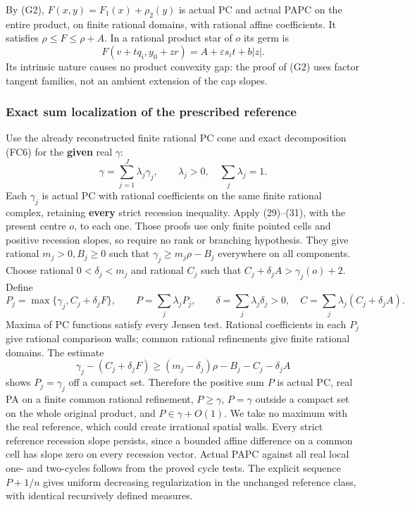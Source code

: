\documentclass[
  11pt,
]{article}
\begin{document}
By (G2), \(F(x,y)=F_1(x)+\rho_2(y)\) is actual PC and actual PAPC on the
entire product, on finite rational domains, with rational affine
coefficients. It satisfies \(\rho\leq F\leq\rho+A\). In a rational
product star of \(o\) its germ is \[
                  F(v+tq_i,y_0+zr)=A+\varepsilon s_it+b|z|. \tag{HR5}
\] Its intrinsic nature causes no product convexity gap: the proof of
(G2) uses factor tangent families, not an ambient extension of the cap
slopes.

\subsubsection{Exact sum localization of the prescribed
reference}\label{exact-sum-localization-of-the-prescribed-reference}

Use the already reconstructed finite rational PC cone and exact
decomposition (FC6) for the \textbf{given} real \(\gamma\): \[
           \gamma=\sum_{j=1}^J\lambda_j\gamma_j,\qquad
           \lambda_j>0,\quad\sum_j\lambda_j=1.              \tag{HR6}
\] Each \(\gamma_j\) is actual PC with rational coefficients on the same
finite rational complex, retaining \textbf{every} strict recession
inequality. Apply (29)--(31), with the present centre \(o\), to each
one. Those proofs use only finite pointed cells and positive recession
slopes, so require no rank or branching hypothesis. They give rational
\(m_j>0,B_j\geq0\) such that \(\gamma_j\geq m_j\rho-B_j\) everywhere on
all components. Choose rational \(0<\delta_j<m_j\) and rational \(C_j\)
such that \(C_j+\delta_jA>\gamma_j(o)+2\). Define \[
 P_j=\max\{\gamma_j,C_j+\delta_jF\},\qquad
 P=\sum_j\lambda_jP_j,\qquad
 \delta=\sum_j\lambda_j\delta_j>0,
 \quad C=\sum_j\lambda_j(C_j+\delta_jA).                   \tag{HR7}
\] Maxima of PC functions satisfy every Jensen test. Rational
coefficients in each \(P_j\) give rational comparison walls; common
rational refinements give finite rational domains. The estimate \[
 \gamma_j-(C_j+\delta_jF)
       \geq(m_j-\delta_j)\rho-B_j-C_j-\delta_jA             \tag{HR8}
\] shows \(P_j=\gamma_j\) off a compact set. Therefore the positive sum
\(P\) is actual PC, real PA on a finite common rational refinement,
\(P\geq\gamma\), \(P=\gamma\) outside a compact set on the whole
original product, and \(P\in\gamma+O(1)\). We take no maximum with the
real reference, which could create irrational spatial walls. Every
strict reference recession slope persists, since a bounded affine
difference on a common cell has slope zero on every recession vector.
Actual PAPC against all real local one- and two-cycles follows from the
proved cycle tests. The explicit sequence \(P+1/n\) gives uniform
decreasing regularization in the unchanged reference class, with
identical recursively defined measures.
\end{document}
